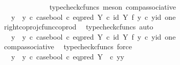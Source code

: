 \begin{isabellebody}
\ \ \ \ \ \ \ \ \ \ \ \ \isamarkupfalse%
\ {\isacharparenleft}{\kern0pt}typecheck{\isacharunderscore}{\kern0pt}cfuncs{\isacharcomma}{\kern0pt}\ meson\ comp{\isacharunderscore}{\kern0pt}associative{}{\isacharparenright}{\kern0pt}\isanewline
\ \ \ \ \ \ \ \ \ \ \isamarkupfalse%
\ \isamarkupfalse%
\ {\isachardoublequoteopen}{\isachardot}{\kern0pt}{\isachardot}{\kern0pt}{\isachardot}{\kern0pt}\ {\isacharequal}{\kern0pt}\ {\isacharparenleft}{\kern0pt}{\isacharparenleft}{\kern0pt}y{}\ {\isasymamalg}\ y{}{\isacharparenright}{\kern0pt}\ {\isasymcirc}\isactrlsub c\ case{\isacharunderscore}{\kern0pt}bool\ {\isasymcirc}\isactrlsub c\ eq{\isacharunderscore}{\kern0pt}pred\ Y\ {\isasymcirc}\isactrlsub c\ {\isacharparenleft}{\kern0pt}id\ Y\ {\isasymtimes}\isactrlsub f\ y{}{\isacharparenright}{\kern0pt}{\isacharparenright}{\kern0pt}\ {\isasymcirc}\isactrlsub c\ {\isasymlangle}y{\isacharcomma}{\kern0pt}id\ one{\isasymrangle}{\isachardoublequoteclose}\isanewline
\ \ \ \ \ \ \ \ \ \ \ \ \isamarkupfalse%
\ right{\isacharunderscore}{\kern0pt}coproj{\isacharunderscore}{\kern0pt}cfunc{\isacharunderscore}{\kern0pt}coprod\ \isamarkupfalse%
\ {\isacharparenleft}{\kern0pt}typecheck{\isacharunderscore}{\kern0pt}cfuncs{\isacharcomma}{\kern0pt}\ auto{\isacharparenright}{\kern0pt}\isanewline
\ \ \ \ \ \ \ \ \ \ \isamarkupfalse%
\ \isamarkupfalse%
\ {\isachardoublequoteopen}{\isachardot}{\kern0pt}{\isachardot}{\kern0pt}{\isachardot}{\kern0pt}\ {\isacharequal}{\kern0pt}\ {\isacharparenleft}{\kern0pt}y{}\ {\isasymamalg}\ y{}{\isacharparenright}{\kern0pt}\ {\isasymcirc}\isactrlsub c\ case{\isacharunderscore}{\kern0pt}bool\ {\isasymcirc}\isactrlsub c\ eq{\isacharunderscore}{\kern0pt}pred\ Y\ {\isasymcirc}\isactrlsub c\ {\isacharparenleft}{\kern0pt}id\ Y\ {\isasymtimes}\isactrlsub f\ y{}{\isacharparenright}{\kern0pt}\ {\isasymcirc}\isactrlsub c\ {\isasymlangle}y{\isacharcomma}{\kern0pt}id\ one{\isasymrangle}{\isachardoublequoteclose}\isanewline
\ \ \ \ \ \ \ \ \ \ \ \ \isamarkupfalse%
\ comp{\isacharunderscore}{\kern0pt}associative{}\ \isamarkupfalse%
\ {\isacharparenleft}{\kern0pt}typecheck{\isacharunderscore}{\kern0pt}cfuncs{\isacharcomma}{\kern0pt}\ force{\isacharparenright}{\kern0pt}\isanewline
\ \ \ \ \ \ \ \ \ \ \isamarkupfalse%
\ \isamarkupfalse%
\ {\isachardoublequoteopen}{\isachardot}{\kern0pt}{\isachardot}{\kern0pt}{\isachardot}{\kern0pt}\ {\isacharequal}{\kern0pt}\ {\isacharparenleft}{\kern0pt}y{}\ {\isasymamalg}\ y{}{\isacharparenright}{\kern0pt}\ {\isasymcirc}\isactrlsub c\ case{\isacharunderscore}{\kern0pt}bool\ {\isasymcirc}\isactrlsub c\ eq{\isacharunderscore}{\kern0pt}pred\ Y\ \ {\isasymcirc}\isactrlsub c\ {\isasymlangle}y{\isacharcomma}{\kern0pt}y{}{\isasymrangle}{\isachardoublequoteclose}\isanewline

\end{isabellebody}
